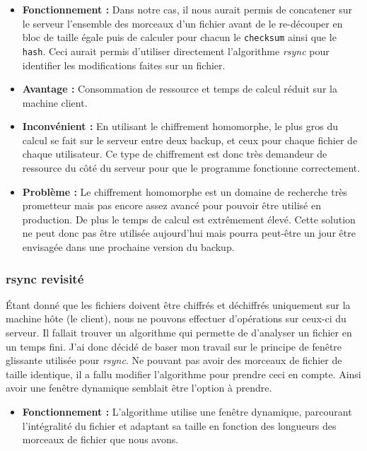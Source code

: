 \documentclass[a4paper,10pt, twoside]{report}
\begin{document}
\begin{spacing}{1.2}
\begin{itemize}
 \item \textbf{Fonctionnement :} Dans notre cas, il nous aurait permis de
 concatener sur le serveur l'ensemble des morceaux d'un fichier avant de le
 re-découper en bloc de taille égale puis de calculer pour chacun le
 \texttt{checksum} ainsi que le \texttt{hash}. Ceci aurait permis d'utiliser
 directement l'algorithme \textit{rsync} pour identifier les modifications
 faites sur un fichier.

 \item \textbf{Avantage :} Consommation de ressource et temps de calcul
 réduit sur la machine client.
 
 \item \textbf{Inconvénient :} En utilisant le chiffrement homomorphe, le
 plus gros du calcul se fait sur le serveur entre deux backup, et ceux pour
 chaque fichier de chaque utilisateur. Ce type de chiffrement est donc très
 demandeur de ressource du côté du serveur pour que le programme fonctionne
 correctement.

 \item \textbf{Problème :} Le chiffrement homomorphe est un domaine de
 recherche très prometteur mais pas encore assez avancé pour pouvoir
 être utilisé en production. De plus le temps de calcul est extrêmement
 élevé. Cette solution ne peut donc pas être utilisée aujourd'hui mais
 pourra peut-être un jour être envisagée dans une prochaine version du
backup.
\end{itemize}

\subsubsection{rsync revisité}
Étant donné que les fichiers doivent être chiffrés et déchiffrés
uniquement sur la machine hôte (le client), nous ne pouvons effectuer
d'opérations sur ceux-ci du serveur. Il fallait trouver un algorithme qui
permette de d'analyser un fichier en un temps fini. J'ai donc décidé de
baser mon travail sur le principe de fenêtre glissante utilisée pour
\textit{rsync}. Ne pouvant pas avoir des morceaux de fichier de taille
identique, il a fallu modifier l'algorithme pour prendre ceci en compte. Ainsi
avoir une fenêtre dynamique semblait être l'option à prendre.

\begin{itemize}
 \item \textbf{Fonctionnement :} L'algorithme utilise une fenêtre dynamique,
 parcourant l'intégralité du fichier et adaptant sa taille en fonction
 des longueurs des morceaux de fichier que nous avons.
 

\end{itemize}
\end{spacing}
\end{document}
